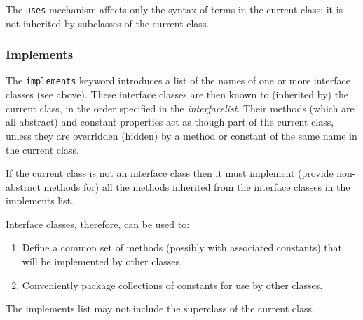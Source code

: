 The \texttt{uses} mechanism affects only the syntax of terms in the
current class; it is not inherited by subclasses of the current class.
\subsubsection{Implements}
 
The \texttt{implements} keyword introduces a list of the names of one or
more interface classes (see above).
These interface classes are then known to (inherited by) the current
class, in the order specified in the \emph{interfacelist}.
Their methods (which are all abstract) and constant properties act as
though part of the current class, unless they are overridden (hidden) by
a method or constant of the same name in the current class.
 
If the current class is not an interface class then it must implement
(provide non-abstract methods for) all the methods inherited from the
interface classes in the implements list.
 
Interface classes, therefore, can be used to:
\begin{enumerate}
\item Define a common set of methods (possibly with associated constants)
that will be implemented by other classes.
\item Conveniently package collections of constants for use by other
classes.
\end{enumerate}
 
The implements list may not include the superclass of the current class.
\index{,}
